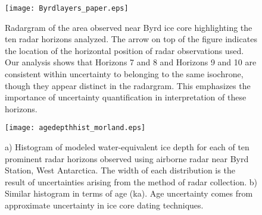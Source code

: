 \documentclass[12pt]{article}
\begin{document}









\begin{figure}
\begin{center}
\texttt{[image: Byrdlayers\_paper.eps]}
\label{radargram}
\captionsetup{width=.9\textwidth}
\caption{Radargram of the area observed near Byrd ice core highlighting the ten radar horizons analyzed. The arrow on top of the figure indicates the location of the horizontal position of radar observations used. Our analysis shows that Horizons 7 and 8 and Horizons 9 and 10 are consistent within uncertainty to belonging to the same isochrone, though they appear distinct in the radargram. This emphasizes the importance of uncertainty quantification in interpretation of these horizons. }
\end{center}
\end{figure}


\begin{figure}
\begin{center}
\texttt{[image: agedepthhist\_morland.eps]}
\label{agedepthhist}
\captionsetup{width=.9\textwidth}
\caption{a) Histogram of modeled water-equivalent ice depth for each of ten prominent radar horizons observed using airborne radar near Byrd Station, West Antarctica. The width of each distribution is the result of uncertainties arising from the method of radar collection. b) Similar histogram in terms of age (ka). Age uncertainty comes from approximate uncertainty in ice core dating techniques. }
\end{center}
\end{figure}
\end{document}
